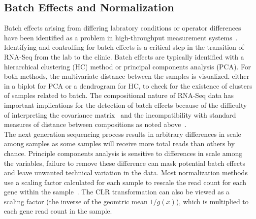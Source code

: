 \documentclass{article}\usepackage[]{graphicx}\usepackage[]{color}
\theoremstyle{definition}
\begin{document}
\subsection{Batch Effects and Normalization}
Batch effects arising from differing labratory conditions or operator differences have been identified as a problem in high-throughput measurement systems~\cite{leek2010, chen2011}.  Identifying and controlling for batch effects is a critical step in the transition of RNA-Seq from the lab to the clinic.  Batch effects are typically identified with a hierarchical clustering (HC) method or principal components analysis (PCA).  For both methods, the multivariate distance between the samples is visualized. either in a biplot for PCA or a dendrogram for HC, to check for the existence of clusters of samples related to batch. %
The compositional nature of RNA-Seq data has important implications for the detection of batch effects because of the difficulty of interpreting the covariance matrix~\cite{Aitchison1986} and the incompatibility with standard measures of distance between compositions as noted above~\cite{Aitchison1986,Martin-Fernandez1998}.\\  %

The next generation sequencing process results in arbitrary differences in scale among samples as some samples will receive more total reads than others by chance. Principle components analysis is sensitive to differences in scale among the variables, failure to remove these difference can mask potential batch effects and leave unwanted technical variation in the data.  Most normalization methods use a scaling factor calculated for each sample to rescale the read count for each gene within the sample~\cite{Dillies2013}.  The CLR transformation can also be viewed as a scaling factor (the inverse of the geomtric mean $1/g(x)$), which is multiplied to each gene read count in the sample.\\
\end{document}
